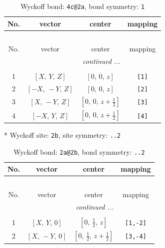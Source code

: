 \documentclass[fleqn,8pt]{jsarticle}
\begin{document}
\renewcommand{\arraystretch}{1.2}
\begin{longtable}{cccc}
\caption{Wyckoff bond: {\tt 4c@2a}, bond symmetry: {\tt 1}}
 \\
 \hline \hline
No. & vector & center & mapping \\ \hline \endfirsthead

\multicolumn{3}{l}{\tablename\ \thetable{}} \\
 \hline \hline
No. & vector & center & mapping \\ \hline \endhead

 \hline \hline
\multicolumn{3}{r}{\footnotesize\it continued ...} \\ \endfoot

 \hline \hline
\multicolumn{3}{r}{} \\ \endlastfoot

1 & $\left[ X,\, Y,\, Z \right]$ & $\left[ 0,\, 0,\, z \right]$ & {\tt [1]} \\ \hline
2 & $\left[ - X,\, - Y,\, Z \right]$ & $\left[ 0,\, 0,\, z \right]$ & {\tt [2]} \\ \hline
3 & $\left[ X,\, - Y,\, Z \right]$ & $\left[ 0,\, 0,\, z + \frac{1}{2} \right]$ & {\tt [3]} \\ \hline
4 & $\left[ - X,\, Y,\, Z \right]$ & $\left[ 0,\, 0,\, z + \frac{1}{2} \right]$ & {\tt [4]} \\
\end{longtable}
* Wyckoff site: {\tt 2b}, site symmetry: {\tt ..2}
\renewcommand{\arraystretch}{1.2}
\begin{longtable}{cccc}
\caption{Wyckoff bond: {\tt 2a@2b}, bond symmetry: {\tt ..2}}
 \\
 \hline \hline
No. & vector & center & mapping \\ \hline \endfirsthead

\multicolumn{3}{l}{\tablename\ \thetable{}} \\
 \hline \hline
No. & vector & center & mapping \\ \hline \endhead

 \hline \hline
\multicolumn{3}{r}{\footnotesize\it continued ...} \\ \endfoot

 \hline \hline
\multicolumn{3}{r}{} \\ \endlastfoot

1 & $\left[ X,\, Y,\, 0 \right]$ & $\left[ 0,\, \frac{1}{2},\, z \right]$ & {\tt [1,-2]} \\ \hline
2 & $\left[ X,\, - Y,\, 0 \right]$ & $\left[ 0,\, \frac{1}{2},\, z + \frac{1}{2} \right]$ & {\tt [3,-4]} \\
\end{longtable}
\end{document}
